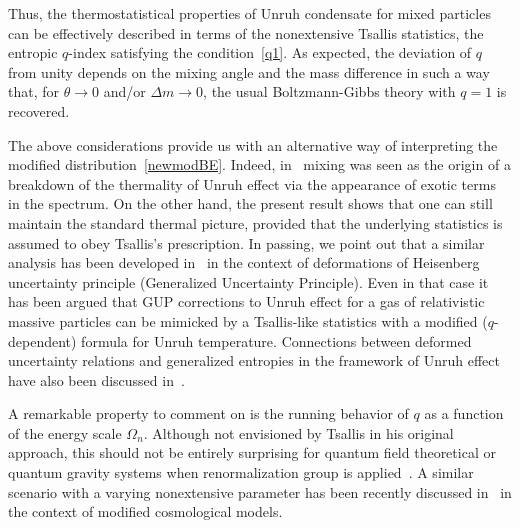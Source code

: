 \documentclass[floats,prd,aps,amssymb,nofootinbib,showkeys]{revtex4}
\begin{document}
Thus, the thermostatistical properties of 
Unruh condensate for mixed particles can
be effectively described in terms of the nonextensive Tsallis statistics, 
the entropic $q$-index satisfying the condition~\eqref{q1}. 
As expected, the deviation of $q$
from unity depends on the mixing angle
and the mass difference in such a way
that, for $\theta\rightarrow0$ and/or $\Delta m\rightarrow0$, 
the usual Boltzmann-Gibbs theory with 
$q=1$ is recovered. 

The above considerations provide us with
an alternative way of interpreting the modified distribution~\eqref{newmodBE}.
Indeed, in~\cite{Luciano} mixing 
was seen as the origin of a breakdown of
the thermality of Unruh effect via the appearance
of exotic terms in the spectrum. 
On the other hand, the present result shows that
one can still maintain the standard thermal picture, %
provided
that the underlying statistics is assumed to obey Tsallis's prescription. 
In passing, we point out
that a similar analysis has been developed in~\cite{Shababi}
in the context of deformations of Heisenberg uncertainty
principle (Generalized Uncertainty Principle).  
Even in that case it has been argued that 
GUP corrections to Unruh effect for a gas of relativistic
massive particles can be
mimicked by a Tsallis-like statistics with 
a modified ($q$-dependent) formula
for Unruh temperature. Connections between
deformed uncertainty relations and generalized
entropies in the framework of Unruh effect have also been discussed in~\cite{deformed2}. 


A remarkable property to comment on 
is the running behavior of $q$ as a function
of the energy scale $\Omega_n$. 
Although not envisioned by Tsallis in his original approach, 
this should not be entirely surprising for quantum field theoretical or quantum gravity systems when renormalization group is applied~\cite{App13}. 
A similar scenario with a varying nonextensive parameter 
has been recently discussed in~\cite{App13}
in the context of modified cosmological models.
\end{document}
